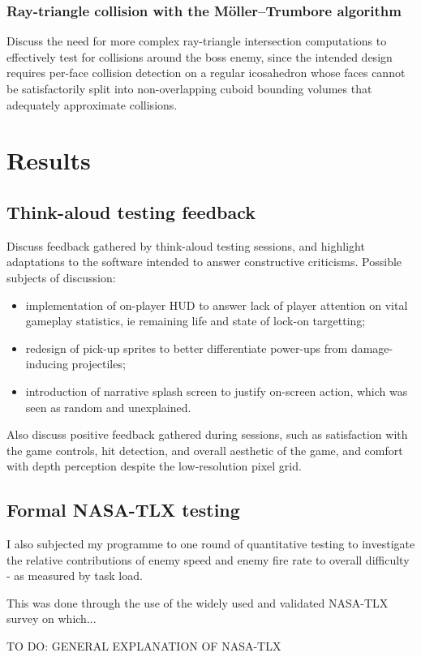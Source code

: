 \documentclass{article}
\begin{document}
\subsubsection*{Ray-triangle collision with the Möller–Trumbore algorithm}
Discuss the need for more complex ray-triangle intersection computations to effectively
test for collisions around the boss enemy, since the intended design requires per-face
collision detection on a regular icosahedron whose faces cannot be satisfactorily
split into non-overlapping cuboid bounding volumes that adequately approximate
collisions.

\section{Results}
\subsection{Think-aloud testing feedback}
Discuss feedback gathered by think-aloud testing sessions, and highlight adaptations
to the software intended to answer constructive criticisms. Possible subjects of
discussion:
\begin{itemize}
   \item implementation of on-player HUD to answer lack of player attention on vital
   gameplay statistics, ie remaining life and state of lock-on targetting;
   \item redesign of pick-up sprites to better differentiate power-ups from
   damage-inducing projectiles;
   \item introduction of narrative splash screen to justify on-screen action, which
   was seen as random and unexplained.
\end{itemize}
Also discuss positive feedback gathered during sessions, such as satisfaction
with the game controls, hit detection, and overall aesthetic of the game, and comfort
with depth perception despite the low-resolution pixel grid.
\subsection{Formal NASA-TLX testing}
I also subjected my programme to one round of quantitative testing to investigate the
relative contributions of enemy speed and enemy fire rate to overall difficulty - as
measured by task load.

This was done through the use of the widely used and validated NASA-TLX survey on which...

TO DO: GENERAL EXPLANATION OF NASA-TLX
\end{document}

